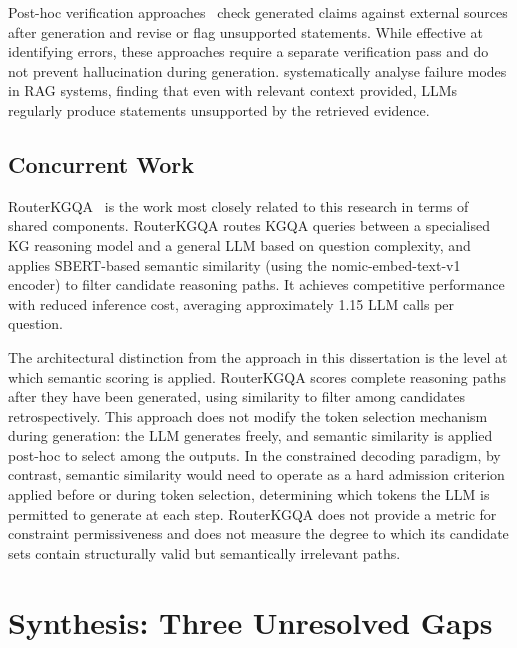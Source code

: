 Post-hoc verification approaches~\citep{nakano2021webgpt, gao2023rarr} check generated claims against external sources after generation and revise or flag unsupported statements. While effective at identifying errors, these approaches require a separate verification pass and do not prevent hallucination during generation. \citet{agrawal2024mindful} systematically analyse failure modes in RAG systems, finding that even with relevant context provided, LLMs regularly produce statements unsupported by the retrieved evidence.

\subsection{Concurrent Work}

RouterKGQA~\citep{yuan2026routerkgqa} is the work most closely related to this research in terms of shared components. RouterKGQA routes KGQA queries between a specialised KG reasoning model and a general LLM based on question complexity, and applies SBERT-based semantic similarity (using the nomic-embed-text-v1 encoder) to filter candidate reasoning paths. It achieves competitive performance with reduced inference cost, averaging approximately 1.15 LLM calls per question.

The architectural distinction from the approach in this dissertation is the level at which semantic scoring is applied. RouterKGQA scores complete reasoning paths after they have been generated, using similarity to filter among candidates retrospectively. This approach does not modify the token selection mechanism during generation: the LLM generates freely, and semantic similarity is applied post-hoc to select among the outputs. In the constrained decoding paradigm, by contrast, semantic similarity would need to operate as a hard admission criterion applied before or during token selection, determining which tokens the LLM is permitted to generate at each step. RouterKGQA does not provide a metric for constraint permissiveness and does not measure the degree to which its candidate sets contain structurally valid but semantically irrelevant paths.

\section{Synthesis: Three Unresolved Gaps}
\label{sec:synthesis}

